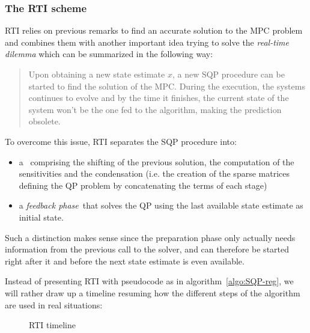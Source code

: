\documentclass[12pt]{article}
\begin{document}
\subsubsection{The RTI scheme}

RTI relies on previous remarks to find an accurate solution to the MPC problem and combines them with another important idea trying to solve the \textit{real-time dilemma} which can be summarized in the following way:

\begin{quote}
	Upon obtaining a new state estimate $x$, a new SQP procedure can be started to find the solution of the MPC.
	During the execution, the systems continues to evolve and by the time it finishes, the current state of the system won't be the one fed to the algorithm, making the prediction obsolete.
\end{quote}

\noindent To overcome this issue, RTI separates the SQP procedure into:
\begin{itemize}[label=\textbullet]
	\item a \color{black}~comprising the shifting of the previous solution, the computation of the sensitivities and the condensation (i.e. the creation of the sparse matrices defining the QP problem by concatenating the terms of each stage)

	\item a \color{blue}\textit{feedback phase}\color{black}~that solves the QP using the last available state estimate as initial state.
\end{itemize}

Such a distinction makes sense since the preparation phase only actually needs information from the previous call to the solver, and can therefore be started right after it and before the next state estimate is even available.

Instead of presenting RTI with pseudocode as in algorithm~\ref{algo:SQP-reg}, we will rather draw up a timeline resuming how the different steps of the algorithm are used in real situations:

\vspace{12pt}

\begin{figure}[H]
	\startchronology[startyear=-3,stopyear=5,startdate=false,dates=false,color=black,width=\textwidth, arrow=true]
	\stopchronology
	\caption{RTI timeline}
	\label{fig:RTI-timeline}
\end{figure}
\end{document}
